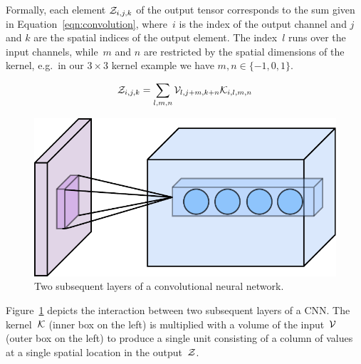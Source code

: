 Formally, each element $\mathcal{Z}_{i, j, k}$ of the output tensor corresponds to the
sum given in Equation~\ref{eqn:convolution}, where~$i$ is the index of the
output channel and $j$ and $k$ are the spatial indices of the output
element.\footnotemark{}
The index~$l$ runs over the input channels, while~$m$ and $n$ are restricted by
the spatial dimensions of the kernel, e.g.\ in our $3 \times 3$ kernel example
we have $m, n \in \{-1, 0, 1\}$.

\begin{equation}
        \mathcal{Z}_{i, j, k} = \sum_{l, m, n} \mathcal{V}_{l, j + m, k + n} \mathcal{K}_{i, l, m, n}
\label{eqn:convolution}
\end{equation}

\begin{figure}
\centering
\includegraphics[width=1.0\textwidth]{Figures/cnn.pdf}
\caption{Two subsequent layers of a convolutional neural network.}
\label{fig:cnn}
\end{figure}

Figure~\ref{fig:cnn} depicts the interaction between two subsequent layers of a
CNN\@. The kernel~$\mathcal{K}$ (inner box on the left) is multiplied with a
volume of the input~$\mathcal{V}$ (outer box on the left) to produce a single unit
consisting of a column of values at a single spatial location in the
output~$\mathcal{Z}$.

